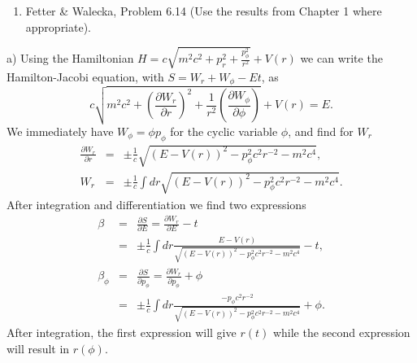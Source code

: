 \documentclass[letterpaper,11pt]{article}
\begin{document}
\begin{enumerate}[resume]
 \item Fetter \& Walecka, Problem 6.14 (Use the results from Chapter 1 where appropriate).
\end{enumerate}

a) Using the Hamiltonian $H = c \sqrt{m^2 c^2 + p_r^2 + \frac{p_\phi^2}{r^2}} + V(r)$ we can write the Hamilton-Jacobi equation, with $S = W_r + W_\phi - E t$, as
\begin{equation*}
 c \sqrt{m^2 c^2 + \left(\frac{\partial W_r}{\partial r}\right)^2 + \frac{1}{r^2} \left(\frac{\partial W_\phi}{\partial \phi}\right)} + V(r) = E.
\end{equation*}
We immediately have $W_\phi = \phi p_\phi$ for the cyclic variable $\phi$, and find for $W_r$
\begin{eqnarray*}
 \frac{\partial W_r}{\partial r} & = & \pm \frac{1}{c} \sqrt{\left(E - V(r)\right)^2 - p_\phi^2 c^2 r^{-2} - m^2 c^4}, \\
 W_r & = & \pm \frac{1}{c} \int dr \sqrt{\left(E - V(r)\right)^2 - p_\phi^2 c^2 r^{-2} - m^2 c^4}.
\end{eqnarray*}
After integration and differentiation we find two expressions
\begin{eqnarray*}
 \beta & = & \frac{\partial S}{\partial E} = \frac{\partial W_r}{\partial E} - t \\
       & = & \pm \frac{1}{c} \int dr \frac{E - V(r)}{\sqrt{\left(E - V(r)\right)^2 - p_\phi^2 c^2 r^{-2} - m^2 c^4}} - t, \\
 \beta_\phi & = & \frac{\partial S}{\partial p_\phi} = \frac{\partial W_r}{\partial p_\phi} + \phi \\
       & = & \pm \frac{1}{c} \int dr \frac{-p_\phi c^2 r^{-2}}{\sqrt{\left(E - V(r)\right)^2 - p_\phi^2 c^2 r^{-2} - m^2 c^4}} + \phi.
\end{eqnarray*}
After integration, the first expression will give $r(t)$ while the second expression will result in $r(\phi)$.
\end{document}
